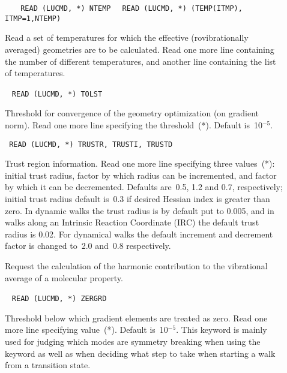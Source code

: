 \begin{description}

\item[]\verb| |\newline
\verb|  READ (LUCMD, *) NTEMP|\newline
\verb|  READ (LUCMD, *) (TEMP(ITMP), ITMP=1,NTEMP)|

Read a set of temperatures for which the
effective (rovibrationally averaged) geometries are to be
calculated. Read one more line containing the number of different
temperatures, and another line containing the list of temperatures.

\item[]\verb| |\newline
\verb|READ (LUCMD, *) TOLST|

Threshold for convergence of the geometry optimization (on gradient
norm).  Read one more line specifying the threshold~(*).  Default
is~10$^{-5}$.

\item[]\verb| |\newline
\verb|READ (LUCMD, *) TRUSTR, TRUSTI, TRUSTD|

Trust region information.  Read one more
line specifying three values~(*): initial trust radius, factor by
which radius can be incremented, and factor by which it can be
decremented.  Defaults are~0.5, 1.2 and 0.7, respectively; initial
trust radius default is~0.3 if desired Hessian index is
greater than zero. In dynamic walks the trust radius
is by default put
to 0.005, and in walks along an Intrinsic Reaction Coordinate
(IRC) the
default trust radius is 0.02. For dynamical walks the default
increment and decrement factor is changed to~2.0 and~0.8
respectively.

\item[]
Request the calculation of the harmonic contribution to the
vibrational average of a molecular property.


\item[]\verb| |\newline
\verb|READ (LUCMD, *) ZERGRD|

Threshold below which gradient elements are
treated as zero.  Read one more line specifying value~(*). Default
is~10$^{-5}$. This keyword is mainly used for judging which modes are
symmetry breaking when using the keyword  as well as
when deciding what step to take when starting a walk from a transition
state.
\end{description}

